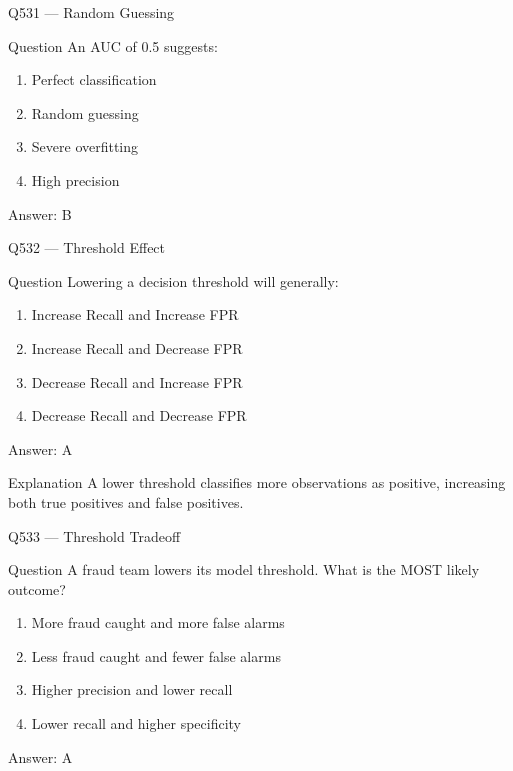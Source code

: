 \documentclass[aspectratio=169,8pt]{beamer}
\begin{document}
\begin{frame}{Q531 --- Random Guessing}
	\begin{block}{Question}
		An AUC of 0.5 suggests:
		\begin{enumerate}
			\item Perfect classification
			\item Random guessing
			\item Severe overfitting
			\item High precision
		\end{enumerate}
	\end{block}
	\begin{exampleblock}{Answer: B}\end{exampleblock}
\end{frame}

\begin{frame}{Q532 --- Threshold Effect}
	\begin{block}{Question}
		Lowering a decision threshold will generally:
		\begin{enumerate}
			\item Increase Recall and Increase FPR
			\item Increase Recall and Decrease FPR
			\item Decrease Recall and Increase FPR
			\item Decrease Recall and Decrease FPR
		\end{enumerate}
	\end{block}
	\begin{exampleblock}{Answer: A}\end{exampleblock}
	\begin{block}{Explanation}
		A lower threshold classifies more observations as positive, increasing both true positives and false positives.
	\end{block}
\end{frame}

\begin{frame}{Q533 --- Threshold Tradeoff}
	\begin{block}{Question}
		A fraud team lowers its model threshold. What is the MOST likely outcome?
		\begin{enumerate}
			\item More fraud caught and more false alarms
			\item Less fraud caught and fewer false alarms
			\item Higher precision and lower recall
			\item Lower recall and higher specificity
		\end{enumerate}
	\end{block}
	\begin{exampleblock}{Answer: A}\end{exampleblock}
\end{frame}
\end{document}
